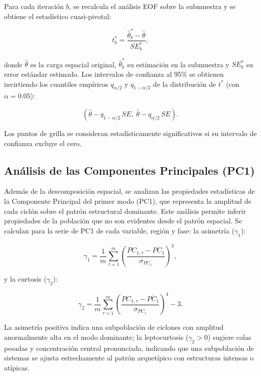 Para cada iteración $b$, se recalcula el análisis EOF sobre la submuestra y se obtiene el estadístico cuasi-pivotal:

\begin{equation}
    t^*_b = \frac{\hat{\theta}^*_b - \hat{\theta}}{SE^*_b},
\end{equation}

donde $\hat{\theta}$ es la carga espacial original, $\hat{\theta}^*_b$ su estimación en la submuestra y $SE^*_b$ su error estándar estimado. Los intervalos de confianza al 95\% se obtienen invirtiendo los cuantiles empíricos $q_{\alpha/2}$ y $q_{1-\alpha/2}$ de la distribución de $t^*$ (con $\alpha = 0.05$):

\begin{equation}
    \left(\hat{\theta} - q_{1-\alpha/2}\,SE,\; \hat{\theta} - q_{\alpha/2}\,SE\right).
\end{equation}

Los puntos de grilla se consideran estadísticamente significativos si su intervalo de confianza excluye el cero.

\subsection{Análisis de las Componentes Principales (PC1)}\label{subsec:analisis_pc}

Además de la descomposición espacial, se analizan las propiedades estadísticas de la Componente Principal del primer modo (PC1), que representa la amplitud de cada ciclón sobre el patrón estructural dominante. Este análisis permite inferir propiedades de la población que no son evidentes desde el patrón espacial. Se calculan para la serie de PC1 de cada variable, región y fase: la asimetría ($\gamma_1$):

\begin{equation}
    \gamma_1 = \frac{1}{m} \sum_{\tau=1}^{m} \left(\frac{PC_{1,\tau} - \overline{PC_1}}{\sigma_{PC_1}}\right)^3,
\end{equation}

y la curtosis ($\gamma_2$):

\begin{equation}
    \gamma_2 = \frac{1}{m} \sum_{\tau=1}^{m} \left(\frac{PC_{1,\tau} - \overline{PC_1}}{\sigma_{PC_1}}\right)^4 - 3.
\end{equation}

La asimetría positiva indica una subpoblación de ciclones con amplitud anormalmente alta en el modo dominante; la leptocurtosis ($\gamma_2 > 0$) sugiere colas pesadas y concentración central pronunciada, indicando que una subpoblación de sistemas se ajusta estrechamente al patrón arquetípico con estructuras intensas o atípicas.

